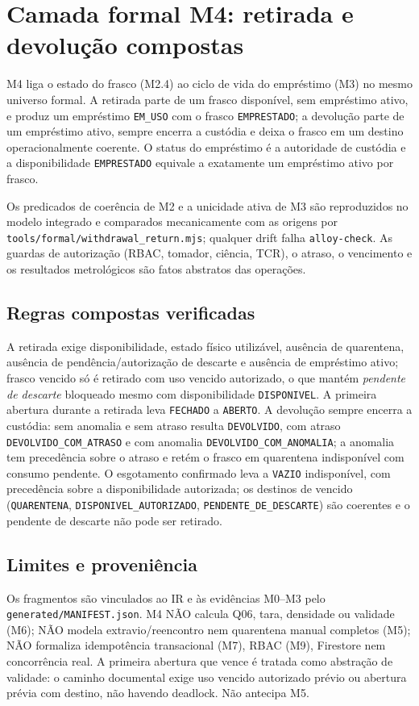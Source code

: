 \clearpage
\section{Camada formal M4: retirada e devolução compostas}
\label{sec:formal-m4}
M4 liga o estado do frasco (M2.4) ao ciclo de vida do empréstimo (M3) no mesmo
universo formal. A retirada parte de um frasco disponível, sem empréstimo ativo,
e produz um empréstimo \texttt{EM\_USO} com o frasco \texttt{EMPRESTADO}; a
devolução parte de um empréstimo ativo, sempre encerra a custódia e deixa o
frasco em um destino operacionalmente coerente. O status do empréstimo é a
autoridade de custódia e a disponibilidade \texttt{EMPRESTADO} equivale a
exatamente um empréstimo ativo por frasco.

Os predicados de coerência de M2 e a unicidade ativa de M3 são reproduzidos no
modelo integrado e comparados mecanicamente com as origens por
\texttt{tools/formal/withdrawal\_return.mjs}; qualquer drift falha \texttt{alloy-check}.
As guardas de autorização (RBAC, tomador, ciência, TCR), o atraso, o vencimento e
os resultados metrológicos são fatos abstratos das operações.

\begingroup
\small
\raggedright

\par
\endgroup

\subsection*{Regras compostas verificadas}
A retirada exige disponibilidade, estado físico utilizável, ausência de
quarentena, ausência de pendência/autorização de descarte e ausência de
empréstimo ativo; frasco vencido só é retirado com uso vencido autorizado, o que
mantém \emph{pendente de descarte} bloqueado mesmo com disponibilidade
\texttt{DISPONIVEL}. A primeira abertura durante a retirada leva \texttt{FECHADO}
a \texttt{ABERTO}. A devolução sempre encerra a custódia: sem anomalia e sem
atraso resulta \texttt{DEVOLVIDO}, com atraso \texttt{DEVOLVIDO\_COM\_ATRASO} e
com anomalia \texttt{DEVOLVIDO\_COM\_ANOMALIA}; a anomalia tem precedência sobre
o atraso e retém o frasco em quarentena indisponível com consumo pendente. O
esgotamento confirmado leva a \texttt{VAZIO} indisponível, com precedência sobre
a disponibilidade autorizada; os destinos de vencido (\texttt{QUARENTENA},
\texttt{DISPONIVEL\_AUTORIZADO}, \texttt{PENDENTE\_DE\_DESCARTE}) são coerentes e
o pendente de descarte não pode ser retirado.

\subsection*{Limites e proveniência}
Os fragmentos são vinculados ao IR e às evidências M0--M3 pelo
\texttt{generated/MANIFEST.json}. M4 NÃO calcula Q06, tara, densidade ou
validade (M6); NÃO modela extravio/reencontro nem quarentena manual completos
(M5); NÃO formaliza idempotência transacional (M7), RBAC (M9), Firestore nem
concorrência real. A primeira abertura que vence é tratada como abstração de
validade: o caminho documental exige uso vencido autorizado prévio ou abertura
prévia com destino, não havendo deadlock. Não antecipa M5.
\par
